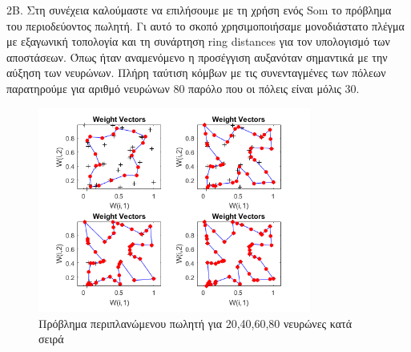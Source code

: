 \documentclass[12pt]{article}
\begin{document}
2B. Στη συνέχεια καλούμαστε να επιλήσουμε με τη χρήση ενός Som το πρόβλημα του περιοδεύοντος πωλητή. Γι αυτό το σκοπό χρησιμοποιήσαμε μονοδιάστατο πλέγμα με εξαγωνική τοπολογία και τη συνάρτηση ring distances για τον υπολογισμό των αποστάσεων. Όπως ήταν αναμενόμενο η προσέγγιση αυξανόταν σημαντικά με την αύξηση των νευρώνων. Πλήρη ταύτιση κόμβων με τις συνενταγμένες των πόλεων παρατηρούμε για αριθμό νευρώνων 80 παρόλο που οι πόλεις είναι μόλις 30.	
		\begin{figure}[H]
	 		\centering
			\includegraphics[width=0.8\textwidth]{fakelos/TSP.png}
			\caption{Πρόβλημα περιπλανώμενου πωλητή για 20,40,60,80 νευρώνες κατά σειρά} 	  
			\label{fig:2}
		\end{figure} 	
		
\end{document}
